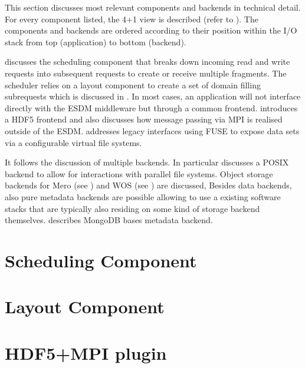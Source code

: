 
\begin{chapterIntro}
	This section discusses most relevant components and backends in technical detail.
	For every component listed, the 4+1 view is described (refer to ).
	The components and backends are ordered according to their position within the I/O stack from top (application) to bottom (backend).

	 discusses the scheduling component that breaks down incoming read and write requests into subsequent requests to create or receive multiple fragments.
	The scheduler relies on a layout component to create a set of domain filling subrequests which is discussed in .
	In most cases, an application will not interface directly with the ESDM middleware but through a common frontend.
	 introduces a HDF5 frontend and also discusses how message passing via MPI is realised outside of the ESDM.
	 addresses legacy interfaces using FUSE to expose data sets via a configurable virtual file systems.

	It follows the discussion of multiple backends.
	In particular  discusses a POSIX backend to allow for interactions with parallel file systems.
	Object storage backends for Mero (see ) and WOS (see ) are discussed,
	Besides data backends, also pure metadata backends are possible allowing to use a existing software stacks that are typically also residing on some kind of storage backend themselves.
	 describes MongoDB bases metadata backend.
\end{chapterIntro}



\section{Scheduling Component}
\label{component: scheduler}


\clearpage
\section{Layout Component}
\label{component: layout}




\clearpage
\section{HDF5+MPI plugin}
\label{frontend: hdf5 + mpi}




